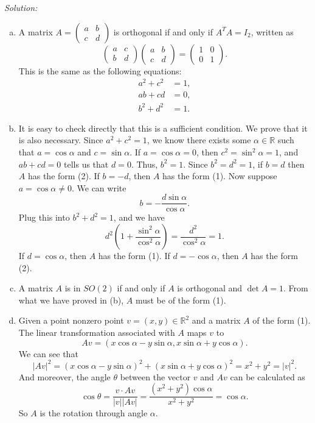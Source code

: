 \documentclass[a4paper, 12pt]{article}
\newenvironment{solution}
    {\textit{Solution:}}
    {}
\begin{document}
\begin{solution}
\begin{enumerate}[(a)]
\item A matrix \(A=\begin{pmatrix}
    a&b\\ 
    c&d
\end{pmatrix}\) is orthogonal if and only if \(A^T A=I_2\), written as 
\[\begin{pmatrix}
    a&c\\ 
    b&d
\end{pmatrix}\begin{pmatrix}
    a&b\\ 
    c&d
\end{pmatrix}=\begin{pmatrix}
    1&0\\ 
    0&1
\end{pmatrix}.\]
This is the same as the following equations:
\begin{align*}
    a^2+c^2&=1,\\
    ab+cd&=0,\\ 
    b^2+d^2&=1. 
\end{align*}
\item It is easy to check directly that this is a sufficient condition. We prove that it is also necessary. Since \(a^2+c^2=1\), we know there exists some \(\alpha\in \mathbb{R}\) such that \(a=\cos \alpha\) and 
\(c=\sin \alpha\). If \(a=\cos \alpha=0\), then \(c^2=\sin^2 \alpha=1\), and \(ab+cd=0\) tells us that \(d=0\). Thus, \(b^2=1\). Since \(b^2=d^2=1\), if \(b=d\) then \(A\) has the form (2). If \(b=-d\), then \(A\) 
has the form (1). Now suppose \(a=\cos \alpha\neq 0\). We can write 
\[b=-\frac{d\sin \alpha}{\cos \alpha}.\]
Plug this into \(b^2+d^2=1\), and we have 
\[d^2(1+\frac{\sin^2 \alpha}{\cos^2 \alpha})=\frac{d^2}{\cos^2 \alpha}=1.\]
If \(d=\cos \alpha\), then \(A\) has the form (1). If \(d=-\cos \alpha\), then \(A\) has the form (2).
\item A matrix \(A\) is in \(SO(2)\) if and only if \(A\) is orthogonal and \(\det A=1\). From what we have proved in (b), \(A\) must be of the form (1). 
\item Given a point nonzero point \(v=(x,y)\in \mathbb{R}^2\) and a matrix \(A\) of the form (1). The linear transformation associated with \(A\) maps \(v\) to 
\[Av=(x\cos \alpha-y\sin \alpha,x\sin \alpha+y\cos \alpha).\]
We can see that 
\[|Av|^2=(x\cos \alpha-y\sin \alpha)^2+(x\sin \alpha+y\cos \alpha)^2=x^2+y^2=|v|^2.\]
And moreover, the angle \(\theta\) between the vector \(v\) and \(Av\) can be calculated as 
\[\cos \theta=\dfrac{v\cdot Av}{|v||Av|}=\dfrac{(x^2+y^2)\cos \alpha}{x^2+y^2}=\cos \alpha.\]
So \(A\) is the rotation through angle \(\alpha\). 


\end{enumerate}
\end{solution}
\end{document}
